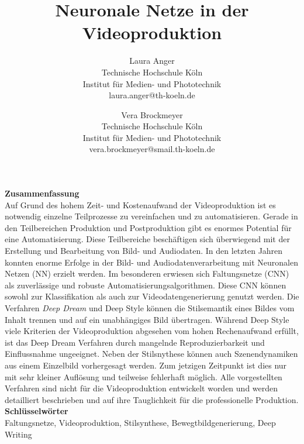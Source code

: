 \documentclass[times, 11pt,twocolumn]{article}
\begin{document}
\title{Neuronale Netze in der Videoproduktion}

\author{Laura Anger\\
Technische Hochschule K\"oln \\ Institut f\"ur Medien- und Phototechnik \\  laura.anger@th-koeln.de \\
\and
Vera Brockmeyer\\
Technische Hochschule K\"oln \\ Institut f\"ur Medien- und Phototechnik \\ vera.brockmeyer@smail.th-koeln.de \\
}

\maketitle
\thispagestyle{empty}


\large{\textbf{Zusammenfassung}}\\ \small %
{} 
 Auf Grund des hohem Zeit- und Kostenaufwand der Videoproduktion ist es notwendig einzelne Teilprozesse zu vereinfachen und zu automatisieren. Gerade in den Teilbereichen Produktion und Postproduktion gibt es enormes Potential für eine Automatisierung. Diese Teilbereiche beschäftigen sich überwiegend mit der Erstellung und Bearbeitung von Bild- und Audiodaten. In den letzten Jahren konnten enorme Erfolge in der Bild- und Audiodatenverarbeitung mit Neuronalen Netzen (NN) erzielt werden. Im besonderen erwiesen sich Faltungsnetze (CNN) als zuverlässige und robuste Automatisierungsalgorithmen. Diese CNN können sowohl zur Klassifikation als auch zur Videodatengenerierung genutzt werden. Die Verfahren \textit{Deep Dream} und Deep Style können die Stilsemantik eines Bildes vom Inhalt trennen und auf ein unabhängiges Bild übertragen. Während Deep Style viele Kriterien der Videoproduktion abgesehen vom hohen Rechenaufwand erfüllt, ist das Deep Dream Verfahren durch mangelnde Reproduzierbarkeit und Einflussnahme ungeeignet. Neben der Stilsnythese können auch Szenendynamiken aus einem Einzelbild vorhergesagt werden. Zum jetzigen Zeitpunkt ist dies nur mit sehr kleiner Auflösung und teilweise fehlerhaft möglich. Alle vorgestellten Verfahren sind nicht für die Videoproduktion entwickelt worden und werden detailliert beschrieben und auf ihre Tauglichkeit für die professionelle Produktion. \\


\large{\textbf{Schl\"usselw\"orter}}\\ \small %
 Faltungsnetze, Videoproduktion, Stilsynthese, Bewegtbildgenerierung, Deep Writing
\end{document}
